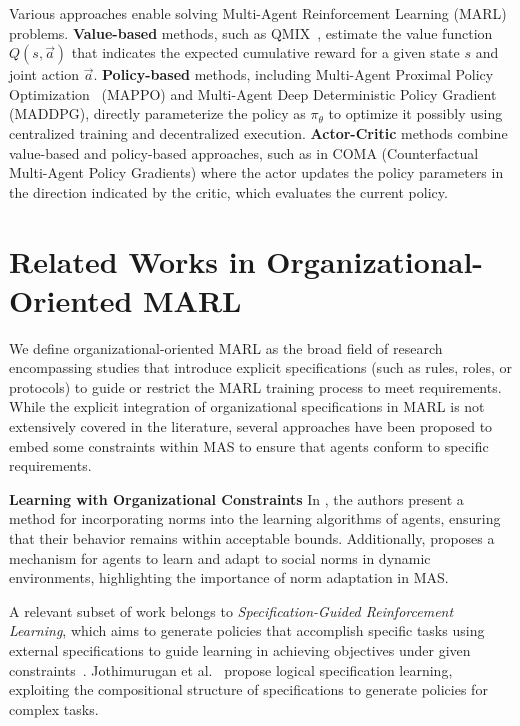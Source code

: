 \documentclass[conference]{IEEEtran}
\begin{document}
Various approaches enable solving Multi-Agent Reinforcement Learning (MARL) problems. \textbf{Value-based} methods, such as QMIX~\cite{rashid2018}, estimate the value function $Q(s,\vec{a})$ that indicates the expected cumulative reward for a given state $s$ and joint action $\vec{a}$. \textbf{Policy-based} methods, including Multi-Agent Proximal Policy Optimization~\cite{yu2022surprising} (MAPPO) and Multi-Agent Deep Deterministic Policy Gradient~\cite{lowe2017multi} (MADDPG), directly parameterize the policy as $\pi_\theta$ to optimize it possibly using centralized training and decentralized execution. \textbf{Actor-Critic} methods combine value-based and policy-based approaches, such as in COMA (Counterfactual Multi-Agent Policy Gradients) where the actor updates the policy parameters in the direction indicated by the critic, which evaluates the current policy.


\section{Related Works in Organizational-Oriented MARL}
\label{sec:related_works}

We define organizational-oriented MARL as the broad field of research encompassing studies that introduce explicit specifications (such as rules, roles, or protocols) to guide or restrict the MARL training process to meet requirements. While the explicit integration of organizational specifications in MARL is not extensively covered in the literature, several approaches have been proposed to embed some constraints within MAS to ensure that agents conform to specific requirements.

\textbf{Learning with Organizational Constraints} \quad
In \cite{cruz2020norms}, the authors present a method for incorporating norms into the learning algorithms of agents, ensuring that their behavior remains within acceptable bounds. Additionally, \cite{villatoro2011social} proposes a mechanism for agents to learn and adapt to social norms in dynamic environments, highlighting the importance of norm adaptation in MAS.

A relevant subset of work belongs to \emph{Specification-Guided Reinforcement Learning}, which aims to generate policies that accomplish specific tasks using external specifications to guide learning in achieving objectives under given constraints~\cite{Bansal2022}. Jothimurugan et al.~\cite{Jothimurugan2021} propose logical specification learning, exploiting the compositional structure of specifications to generate policies for complex tasks.
\end{document}
